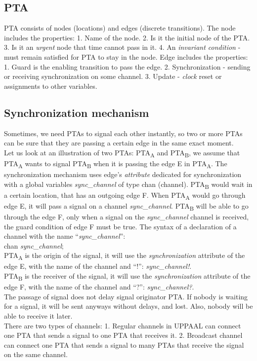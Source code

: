 \subsection{PTA }
PTA consists of nodes (locations) and edges (discrete transitions). The node includes the properties: 1. Name of the node. 2. Is it the initial node of the PTA. 3. Is it an \textit{urgent} node that time cannot pass in it. 4. An \textit{\textit{invariant condition}} - must remain satisfied for PTA to stay in the node. Edge includes the properties: 1. Guard is the enabling transition to pass the edge. 2. Synchronization - sending or receiving synchronization on some channel. 3. Update - \textit{clock} reset or assignments to other variables.\\
\subsection{Synchronization mechanism}
Sometimes, we need PTAs to signal each other instantly, so two or more PTAs can be sure that they are passing a certain edge in the same exact moment.\\
Let us look at an illustration of two PTAs: PTA\textsubscript{A} and PTA\textsubscript{B}, we assume that PTA\textsubscript{A} wants to signal PTA\textsubscript{B} when it is passing the edge E in PTA\textsubscript{A}. The synchronization mechanism uses edge’s \textit{attribute} dedicated for synchronization with a global variables \textcolor{ColorUppaalChannel}{\textit{sync_channel}} of type chan (channel). PTA\textsubscript{B} would wait in a certain location, that has an outgoing edge F. When PTA\textsubscript{A} would go through edge E, it will pass a signal on a channel \textcolor{ColorUppaalChannel}{\textit{sync_channel}}. PTA\textsubscript{B} will be able to go through the edge F, only when a signal on the \textcolor{ColorUppaalChannel}{\textit{sync_channel}} channel is received, the guard condition of edge F must be true.  The syntax of a declaration of a channel with the name “\textcolor{ColorUppaalChannel}{\textit{sync_channel}}”:\\
        chan \textcolor{ColorUppaalChannel}{\textit{sync_channel}};\\
PTA\textsubscript{A} is the origin of the signal, it will use the \textit{synchronization} attribute of the edge E, with the name of the channel and “!”: \textcolor{ColorUppaalChannel}{\textit{sync_channel!}}.\\
PTA\textsubscript{B} is the receiver of the signal, it will use the \textit{synchronization} attribute of the edge F, with the name of the channel and “?”: \textcolor{ColorUppaalChannel}{\textit{sync_channel?}}.\\
The passage of signal does not delay signal originator PTA. If nobody is waiting for a signal, it will be sent anyways without delays, and lost. Also, nobody will be able to receive it later.\\
There are two types of channels: 1. Regular channels in UPPAAL can connect one PTA that sends a signal to one PTA that receives it. 2. Broadcast channel can connect one PTA that sends a signal to many PTAs that receive the signal on the same channel. \\
